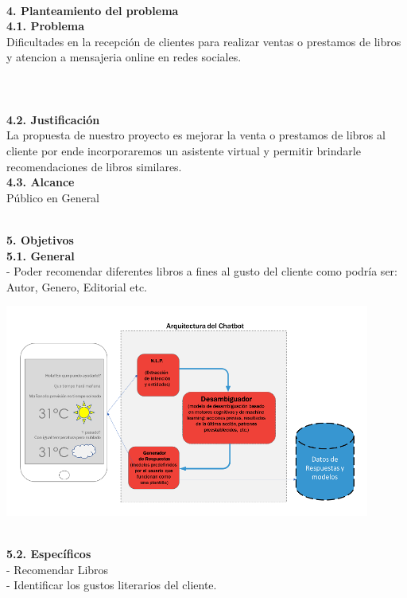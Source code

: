 \begin{flushleft}
\begin{itemize}
\textbf{ }\\

\textbf{4.	Planteamiento del problema}\\
\textbf{4.1. 	Problema}\\

Dificultades en la recepción de clientes para realizar ventas o prestamos de libros y atencion a mensajeria online en redes sociales.\textbf{ }\\
\textbf{ }\\
\textbf{ }\\
\textbf{ }\\
\textbf{4.2.	Justificación }\\

La propuesta de nuestro proyecto es mejorar la venta o prestamos de libros al cliente por ende incorporaremos un asistente virtual y permitir brindarle recomendaciones de libros similares. 
\textbf{ }\\
\textbf{4.3.	Alcance }\\
Público en General


\textbf{ }\\
\textbf{5.      Objetivos}\\
\textbf{5.1.   General}\\
-	Poder recomendar diferentes libros a fines al gusto del cliente como podría ser: Autor, Genero, Editorial etc.
\begin{center}
	\includegraphics[width=12cm]{./Imagenes/chatbot} 
	\end{center}

\textbf{ }\\

\textbf{5.2.   Específicos}\\

-	Recomendar Libros\\
-	Identificar los gustos literarios del cliente.\\




\end{itemize}
\end{flushleft}
